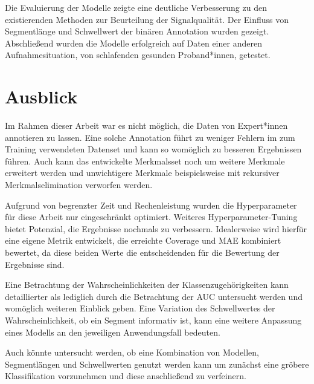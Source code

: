 Die Evaluierung der Modelle zeigte eine deutliche Verbesserung zu den existierenden Methoden zur Beurteilung der Signalqualität. Der Einfluss von Segmentlänge und Schwellwert der binären Annotation wurden gezeigt. Abschließend wurden die Modelle erfolgreich auf Daten einer anderen Aufnahmesituation, von schlafenden gesunden Proband*innen, getestet.

\section{Ausblick}

Im Rahmen dieser Arbeit war es nicht möglich, die Daten von Expert*innen annotieren zu lassen. Eine solche Annotation führt zu weniger Fehlern im zum Training verwendeten Datenset und kann so womöglich zu besseren Ergebnissen führen. Auch kann das entwickelte Merkmalsset noch um weitere Merkmale erweitert werden und unwichtigere Merkmale beispielsweise mit rekursiver Merkmalselimination verworfen werden.

Aufgrund von begrenzter Zeit und Rechenleistung wurden die Hyperparameter für diese Arbeit nur eingeschränkt optimiert. Weiteres Hyperparameter-Tuning bietet Potenzial, die Ergebnisse nochmals zu verbessern. Idealerweise wird hierfür eine eigene Metrik entwickelt, die erreichte Coverage und \ac{MAE} kombiniert bewertet, da diese beiden Werte die entscheidenden für die Bewertung der Ergebnisse sind.

Eine Betrachtung der Wahrscheinlichkeiten der Klassenzugehörigkeiten kann detaillierter als lediglich durch die Betrachtung der \ac{AUC} untersucht werden und womöglich weiteren Einblick geben. Eine Variation des Schwellwertes der Wahrscheinlichkeit, ob ein Segment informativ ist, kann eine weitere Anpassung eines Modells an den jeweiligen Anwendungsfall bedeuten.

Auch könnte untersucht werden, ob eine Kombination von Modellen, Segmentlängen und Schwellwerten genutzt werden kann um zunächst eine gröbere Klassifikation vorzunehmen und diese anschließend zu verfeinern.




